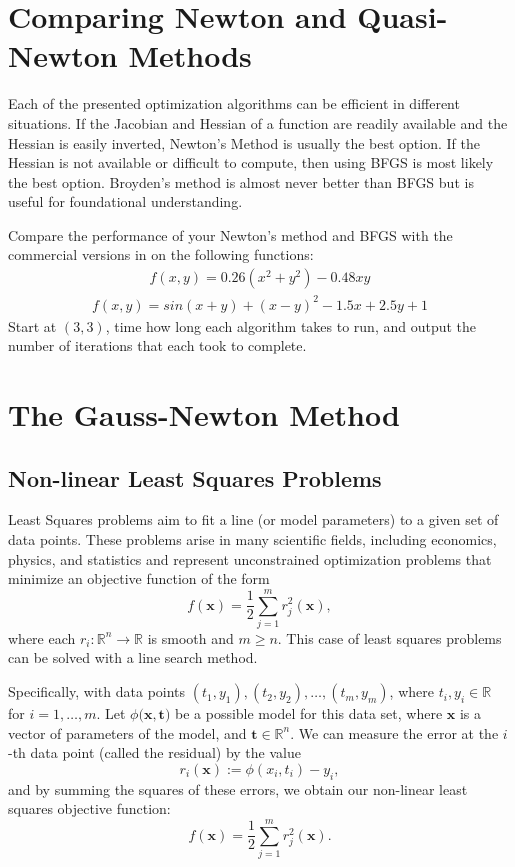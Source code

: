 \section*{Comparing Newton and Quasi-Newton Methods}

Each of the presented optimization algorithms can be efficient in different situations.
If the Jacobian and Hessian of a function are readily available and the Hessian is easily inverted, Newton's Method is usually the best option. 
If the Hessian is not available or difficult to compute, then using BFGS is most likely the best option.
Broyden's method is almost never better than BFGS but is useful for foundational understanding.

\begin{problem}
Compare the performance of your Newton's method and BFGS with the commercial versions in  on the following functions:
\begin{align*}
f(x,y) = 0.26(x^2+y^2) - 0.48xy
\end{align*}
\begin{align*}
f(x,y) = sin(x+y) + (x-y)^2 - 1.5x + 2.5y + 1
\end{align*}
Start at $(3,3)$, time how long each algorithm takes to run, and output the number of iterations that each took to complete.
\end{problem}

\section*{The Gauss-Newton Method}
\subsection*{Non-linear Least Squares Problems}
Least Squares problems aim to fit a line (or model parameters) to a given set of data points. 
These problems arise in many scientific fields, including economics, physics, and statistics and represent unconstrained optimization problems that minimize an objective function of the form
$$
f(\mathbf{x}) = \frac{1}{2}\displaystyle\sum_{j=1}^m r_j^2(\mathbf{x}),
$$
where each $r_i : \mathbb{R}^n \rightarrow \mathbb{R}$ is smooth and $m \geq n$.
This case of least squares problems can be solved with a line search method.

Specifically, with data points $(t_1, y_1), (t_2, y_2), \ldots, (t_m, y_m)$, where $t_i,y_i \in \mathbb{R}$ for $i = 1, \ldots, m$. 
Let $\phi(\mathbf{x}, \mathbf{t)}$ be a possible model for this data set, where $\mathbf{x}$ is a vector of parameters of the model, and $\mathbf{t} \in \mathbb{R}^n$. 
We can measure the error at the $i$-th data point (called the residual) by the value $$r_i(\mathbf{x}) := \phi(x_i, t_i) - y_i,$$ and by summing the squares of these errors, we obtain our non-linear least squares objective function:
$$
f(\mathbf{x}) = \frac{1}{2} \displaystyle \sum_{j=1}^m  r_j^2(\mathbf{x}).
$$

